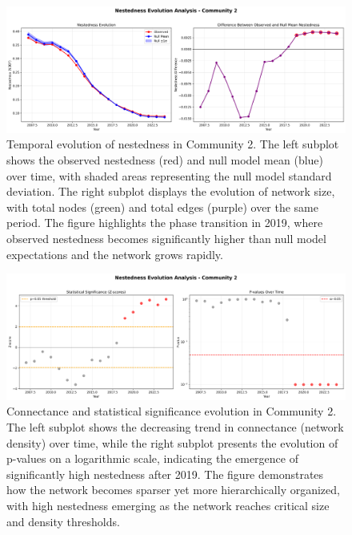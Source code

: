 \begin{figure}[htbp]
\hspace*{-1cm}\centering
\includegraphics[width=1.2\textwidth]{../figures/us/nestedness_evolution_community_2_pt1.png}
\caption{Temporal evolution of nestedness in Community 2. The left subplot shows the observed nestedness (red) and null model mean (blue) over time, with shaded areas representing the null model standard deviation. The right subplot displays the evolution of network size, with total nodes (green) and total edges (purple) over the same period. The figure highlights the phase transition in 2019, where observed nestedness becomes significantly higher than null model expectations and the network grows rapidly.}
\label{fig:observed_vs_null_model}
\end{figure}

\begin{figure}[htbp]
\hspace*{-1cm}\centering
\includegraphics[width=1.2\textwidth]{../figures/us/nestedness_evolution_community_2_pt2.png}
\caption{Connectance and statistical significance evolution in Community 2. The left subplot shows the decreasing trend in connectance (network density) over time, while the right subplot presents the evolution of p-values on a logarithmic scale, indicating the emergence of significantly high nestedness after 2019. The figure demonstrates how the network becomes sparser yet more hierarchically organized, with high nestedness emerging as the network reaches critical size and density thresholds.}
\label{fig:connectance_evolution}
\end{figure}


